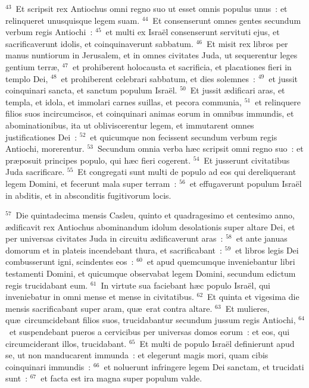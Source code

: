 ${}^{43}$~Et scripsit rex Antiochus omni regno suo ut esset omnis populus unus~: et relinqueret unusquisque legem suam.
${}^{44}$~Et consenserunt omnes gentes secundum verbum regis Antiochi~:
${}^{45}$~et multi ex Isra\"el consenserunt servituti ejus, et sacrificaverunt idolis, et coinquinaverunt sabbatum.
${}^{46}$~Et misit rex libros per manus nuntiorum in Jerusalem, et in omnes civitates Juda, ut sequerentur leges gentium terr\ae ,
${}^{47}$~et prohiberent holocausta et sacrificia, et placationes fieri in templo Dei,
${}^{48}$~et prohiberent celebrari sabbatum, et dies solemnes~:
${}^{49}$~et jussit coinquinari sancta, et sanctum populum Isra\"el.
${}^{50}$~Et jussit \ae dificari aras, et templa, et idola, et immolari carnes suillas, et pecora communia,
${}^{51}$~et relinquere filios suos incircumcisos, et coinquinari animas eorum in omnibus immundis, et abominationibus, ita ut obliviscerentur legem, et immutarent omnes justificationes Dei~:
${}^{52}$~et quicumque non fecissent secundum verbum regis Antiochi, morerentur.
${}^{53}$~Secundum omnia verba h\ae c scripsit omni regno suo~: et pr\ae posuit principes populo, qui h\ae c fieri cogerent.
${}^{54}$~Et jusserunt civitatibus Juda sacrificare.
${}^{55}$~Et congregati sunt multi de populo ad eos qui dereliquerant legem Domini, et fecerunt mala super terram~:
${}^{56}$~et effugaverunt populum Isra\"el in abditis, et in absconditis fugitivorum locis.


${}^{57}$~Die quintadecima mensis Casleu, quinto et quadragesimo et centesimo anno, \ae dificavit rex Antiochus abominandum idolum desolationis super altare Dei, et per universas civitates Juda in circuitu \ae dificaverunt aras~:
${}^{58}$~et ante januas domorum et in plateis incendebant thura, et sacrificabant~:
${}^{59}$~et libros legis Dei combusserunt igni, scindentes eos~:
${}^{60}$~et apud quemcumque inveniebantur libri testamenti Domini, et quicumque observabat legem Domini, secundum edictum regis trucidabant eum.
${}^{61}$~In virtute sua faciebant h\ae c populo Isra\"el, qui inveniebatur in omni mense et mense in civitatibus.
${}^{62}$~Et quinta et vigesima die mensis sacrificabant super aram, qu\ae\ erat contra altare.
${}^{63}$~Et mulieres, qu\ae\ circumcidebant filios suos, trucidabantur secundum jussum regis Antiochi,
${}^{64}$~et suspendebant pueros a cervicibus per universas domos eorum~: et eos, qui circumciderant illos, trucidabant.
${}^{65}$~Et multi de populo Isra\"el definierunt apud se, ut non manducarent immunda~: et elegerunt magis mori, quam cibis coinquinari immundis~:
${}^{66}$~et noluerunt infringere legem Dei sanctam, et trucidati sunt~:
${}^{67}$~et facta est ira magna super populum valde.

